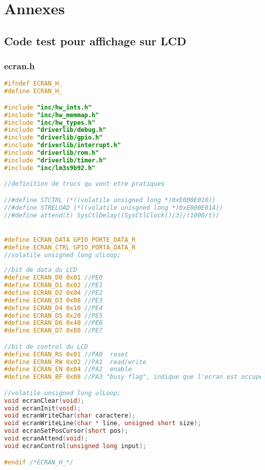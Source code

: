
\chapter{Annexes}
\label{s:annexes}

\section{Code test pour affichage sur LCD} \label{s:code_LCD}
\subsection{ecran.h}
\begin{lstlisting}[language=C]
#ifndef ECRAN_H_
#define ECRAN_H_

#include "inc/hw_ints.h"
#include "inc/hw_memmap.h"
#include "inc/hw_types.h"
#include "driverlib/debug.h"
#include "driverlib/gpio.h"
#include "driverlib/interrupt.h"
#include "driverlib/rom.h"
#include "driverlib/timer.h"
#include "inc/lm3s9b92.h"

//definition de trucs qu vont etre pratiques

//#define STCTRL (*((volatile unsigned long *)0xE000E010))
//#define STRELOAD (*((volatile unisgned long *)0xE000E014))
//#define attend(t) SysCtlDelay((SysCtlClock()/3)/(1000/t))


#define ECRAN_DATA GPIO_PORTE_DATA_R
#define ECRAN_CTRL GPIO_PORTA_DATA_R
//volatile unsigned long ulLoop;
	
//bit de data du LCD
#define ECRAN_D0 0x01 //PE0
#define ECRAN_D1 0x02 //PE1
#define ECRAN_D2 0x04 //PE2
#define ECRAN_D3 0x08 //PE3 
#define ECRAN_D4 0x10 //PE4
#define ECRAN_D5 0x20 //PE5
#define ECRAN_D6 0x40 //PE6
#define ECRAN_D7 0x80 //PE7

//bit de control du LCD
#define ECRAN_RS 0x01 //PA0  reset
#define ECRAN_RW 0x02 //PA1  read/write
#define ECRAN_EN 0x04 //PA2  enable
#define ECRAN_BF 0x08 //PA3 "busy flag", indique que l'ecran est occupe

//volatile unsigned long ulLoop;
void ecranClear(void);
void ecranInit(void);
void ecranWriteChar(char caractere);
void ecranWriteLine(char * line, unsigned short size);
void ecranSetPosCursor(short pos);
void ecranAttend(void);
void ecranControl(unsigned long input);

#endif /*ECRAN_H_*/

\end{lstlisting}

